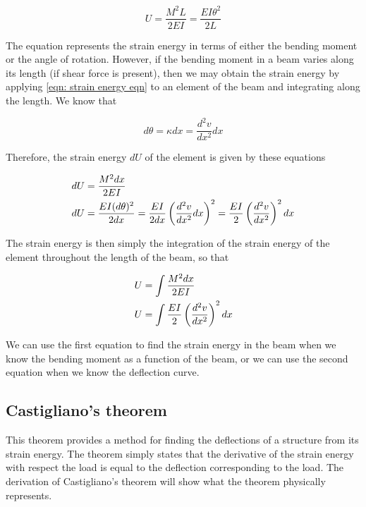 \documentclass[
10pt,
a4paper,
openany,
svgnames,
]{book} %
\begin{document}
\begin{equation} \label{eqn: strain energy eqn}
  U = \frac{M^2L}{2EI} = \frac{EI\theta ^2}{2L}
\end{equation}

The equation represents the strain energy in terms of either the bending moment or the angle of rotation. However, if the bending moment in a beam varies along its length (if shear force is present), then we may obtain the strain energy by applying \cref{eqn: strain energy eqn} to an element of the beam and integrating along the length. We know that

\[d\theta  = \kappa dx = \frac{{{d^2}v}}{{d{x^2}}}dx\]

Therefore, the strain energy $dU$ of the element is given by these equations

\[\begin{gathered}
  dU = \frac{M^2dx}{2EI} \hfill \\
  dU = \frac{EI(d\theta )^2}{2dx} = \frac{EI}{2dx}\left( \frac{d^2v}{dx^2}dx \right)^2 = \frac{EI}{2}\left( \frac{d^2v}{dx^2} \right)^2dx \hfill \\ 
\end{gathered} \]

The strain energy is then simply the integration of the strain energy of the element throughout the length of the beam, so that

\begin{equation}
  \begin{gathered}
    U = \int \frac{M^2dx}{2EI}  \hfill \\
    U = \int \frac{EI}{2} \left( \frac{d^2v}{dx^2} \right)^2dx  \hfill \\ 
  \end{gathered}
\end{equation}

We can use the first equation to find the strain energy in the beam when we know the bending moment as a function of the beam, or we can use the second equation when we know the deflection curve.

\subsection{Castigliano’s theorem}

This theorem provides a method for finding the deflections of a structure from its strain energy. The theorem simply states that the derivative of the strain energy with respect the load is equal to the deflection corresponding to the load. The derivation of Castigliano’s theorem will show what the theorem physically represents.
\end{document}
